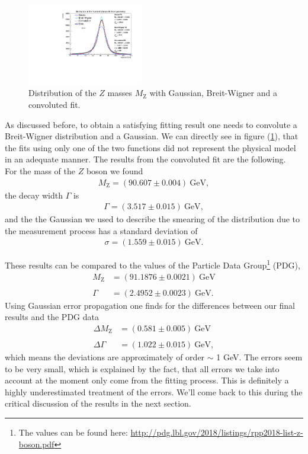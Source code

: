 \documentclass[twocolumn,
			   showpacs,%
               nofootinbib,
               aps,%
               prd,
               notitlepage,
               showkeys,
               10pt]{revtex4-1}
\begin{document}
\begin{figure}[H]
	\centering
	\includegraphics[width = 0.45\textwidth]{figures/plots/ZMassFitted}
	\caption{Distribution of the $Z$ masses $M_{\mathrm{Z}}$ with Gaussian, Breit-Wigner and a convoluted fit.}
	\label{fig:MassDist}
\end{figure}

As discussed before, to obtain a satisfying fitting result one needs to convolute a Breit-Wigner distribution and a Gaussian. We can directly see in figure (\ref{fig:MassDist}), that the fits using only one of the two functions did not represent the physical model in an adequate manner.
The results from the convoluted fit are the following. \\

For the mass of the $Z$ boson we found
\begin{align}
	M_{\mathrm{Z}} = (90.607 \pm 0.004) \ \text{GeV},
\end{align} 
the decay width $\Gamma$ is
\begin{align}
\Gamma = (3.517 \pm 0.015) \ \text{GeV},	
\end{align}
and the the Gaussian we used to describe the smearing of the distribution due to the measurement process has a standard deviation of 
\begin{align}
	\sigma = (1.559 \pm 0.015) \ \text{GeV}.
\end{align}

These results can be compared to the values of the Particle Data Group\footnote{The values can be found here: \url{http://pdg.lbl.gov/2018/listings/rpp2018-list-z-boson.pdf}} (PDG), 
\begin{align}
	M_{\mathrm{Z}}&=(91.1876 \pm 0.0021) \ \mathrm{GeV} \\  \nonumber\\ \Gamma&=(2.4952 \pm 0.0023) \ \mathrm{GeV}.
\end{align} 
Using Gaussian error propagation one finds for the differences between our final results and the PDG data
\begin{align}
	\Delta M_{\mathrm{Z}}&=(0.581 \pm 0.005) \ \mathrm{GeV} \\  \nonumber\\ 
	\Delta\Gamma&=(1.022 \pm 0.015) \ \mathrm{GeV},
\end{align} 
which means the deviations are approximately of order $\sim$ 1 GeV. The errors seem to be very small, which is explained by the fact, that all errors we take into account at the moment only come from the fitting process. This is definitely a highly underestimated treatment of the errors. We'll come back to this during the critical discussion of the results in the next section.
\end{document}
